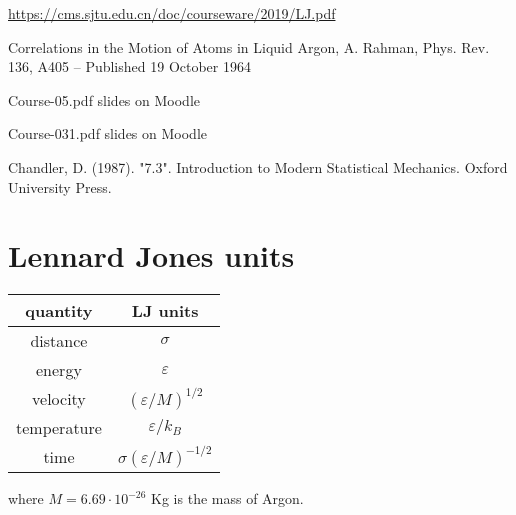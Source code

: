 \documentclass[12pt,english]{smfart}
\begin{document}
\def\refname{D\MakeLowercase{ocumentation and sources}}
\begin{thebibliography}{99}

\url{https://cms.sjtu.edu.cn/doc/courseware/2019/LJ.pdf}

Correlations in the Motion of Atoms in Liquid Argon, A. Rahman, Phys. Rev. 136, A405 – Published 19 October 1964

Course-05.pdf slides on Moodle

Course-031.pdf slides on Moodle

Chandler, D. (1987). "7.3". Introduction to Modern Statistical Mechanics. Oxford University Press.

\end{thebibliography}


\appendix
\label{appendix}

\section{Lennard Jones units} \label{app:ljunits}

\begin{table}[H]
\begin{tabular}{c|c}
quantity & LJ units \\
\hline
distance & $\sigma$ \\
energy & $\varepsilon$ \\
velocity & $(\varepsilon / M)^{1/2}$ \\
temperature & $\varepsilon / k_B$ \\
time & $\sigma (\varepsilon / M)^{-1/2}$
\end{tabular}
\end{table}

where $M = 6.69 \cdot 10^{-26}$ \si{Kg} is the mass of Argon.
\end{document}
